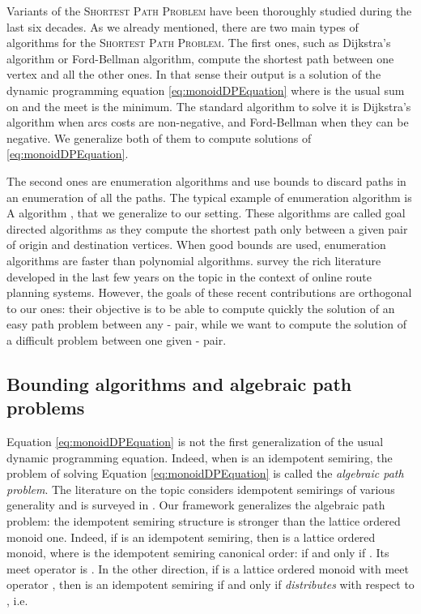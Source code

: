 \documentclass[11pt]{amsart}
\theoremstyle{plain}
\theoremstyle{remark}
\newcommand{\SP}{\textsc{Shortest Path Problem}\xspace}
\begin{document}
Variants of the \SP have been thoroughly studied during the last six decades. As we already mentioned, there are two main types of algorithms for the \SP. The first ones, such as Dijkstra's algorithm or Ford-Bellman algorithm, compute the shortest path between one vertex and all the other ones. In that sense their output is a solution of the dynamic programming equation \eqref{eq:monoidDPEquation} where  is the usual sum on  and the meet  is the minimum. The standard algorithm to solve it is Dijkstra's algorithm \cite{dijkstra1959note} when arcs costs are non-negative, and Ford-Bellman \cite{ford1956maximal,bellman1958routing} when they can be negative. We generalize both of them to compute solutions of \eqref{eq:monoidDPEquation}.

The second ones are enumeration algorithms and use bounds to discard paths in an enumeration of all the paths. The typical example of enumeration algorithm is A algorithm \cite{hart1968formal}, that we generalize to our setting. These algorithms are called goal directed algorithms as they compute the shortest path only between a given pair of origin and destination vertices. When good bounds are used, enumeration algorithms are faster than polynomial algorithms. \citet{bast2014route} survey the rich literature developed in the last few years on the topic in the context of online route planning systems. However, the goals of these recent contributions are orthogonal to our ones: their objective is to be able to compute quickly the solution of an easy path problem between any - pair, while we want to compute the solution of a  difficult problem between one given - pair.









\subsection{Bounding algorithms and algebraic path problems} \label{sub:bounding_algorithms_and_resource_constrained_shortest_path_problem}



Equation \eqref{eq:monoidDPEquation} is not the first generalization of the usual dynamic programming equation. Indeed, when  is an idempotent semiring, the problem of solving Equation \eqref{eq:monoidDPEquation} is called the \emph{algebraic path problem}. The literature on the topic considers idempotent semirings of various generality \cite{aho1974design,backhouse1975regular,carre1971algebra,zimmermann1981linear,fink1992survey,gondran2008graphs,lehmann1977algebraic,roy1959transitivite,mohri2002semiring} and is surveyed in \cite{fink1992survey}. Our framework generalizes the algebraic path problem:  the idempotent semiring structure is stronger than the lattice ordered monoid one. Indeed, if  is an idempotent semiring, then  is a lattice ordered monoid, where  is the idempotent semiring canonical order:  if and only if . Its meet operator is . In the other direction, if  is a lattice ordered monoid with meet operator , then  is an idempotent semiring if and only if  \emph{distributes} with respect to , i.e.
\end{document}
